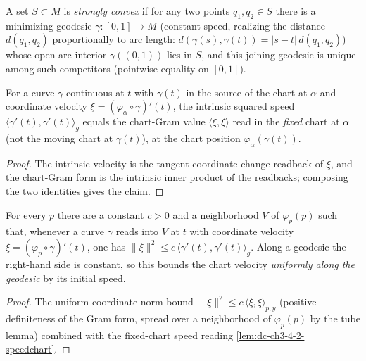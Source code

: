 \begin{definition}
  \label{def:dc-ch3-4-2-stronglyconvex}


  A set $S\subset M$ is \emph{strongly convex} if for any two points $q_1,q_2\in\overline{S}$
  there is a minimizing geodesic $\gamma:[0,1]\to M$ (constant-speed, realizing the distance
  $d(q_1,q_2)$ proportionally to arc length: $d(\gamma(s),\gamma(t))=|s-t|\,d(q_1,q_2)$) whose
  open-arc interior $\gamma((0,1))$ lies in $S$, and this joining geodesic is unique among such
  competitors (pointwise equality on $[0,1]$).
\end{definition}

\begin{lemma}
  \label{lem:dc-ch3-4-2-speedchart}


  For a curve $\gamma$ continuous at $t$ with $\gamma(t)$ in the source of the chart at $\alpha$ and
  coordinate velocity $\xi=(\varphi_\alpha\circ\gamma)'(t)$, the intrinsic squared speed
  $\langle\gamma'(t),\gamma'(t)\rangle_g$ equals the chart-Gram value
  $\langle\xi,\xi\rangle$ read in the \emph{fixed} chart at $\alpha$ (not the moving chart at
  $\gamma(t)$), at the chart position $\varphi_\alpha(\gamma(t))$.
\end{lemma}
\begin{proof}
  \sketch

  The intrinsic velocity is the tangent-coordinate-change readback of $\xi$, and the chart-Gram form
  is the intrinsic inner product of the readbacks; composing the two identities gives the claim.
\end{proof}

\begin{lemma}
  \label{lem:dc-ch3-4-2-velbound}


  For every $p$ there are a constant $c>0$ and a neighborhood $V$ of $\varphi_p(p)$ such that, whenever
  a curve $\gamma$ reads into $V$ at $t$ with coordinate velocity $\xi=(\varphi_p\circ\gamma)'(t)$, one
  has $\|\xi\|^2\le c\,\langle\gamma'(t),\gamma'(t)\rangle_g$. Along a geodesic the right-hand side is
  constant, so this bounds the chart velocity \emph{uniformly along the geodesic} by its initial speed.
\end{lemma}
\begin{proof}
  \sketch

  The uniform coordinate-norm bound $\|\xi\|^2\le c\,\langle\xi,\xi\rangle_{p,y}$ (positive-definiteness
  of the Gram form, spread over a neighborhood of $\varphi_p(p)$ by the tube lemma) combined with the
  fixed-chart speed reading \cref{lem:dc-ch3-4-2-speedchart}.
\end{proof}

